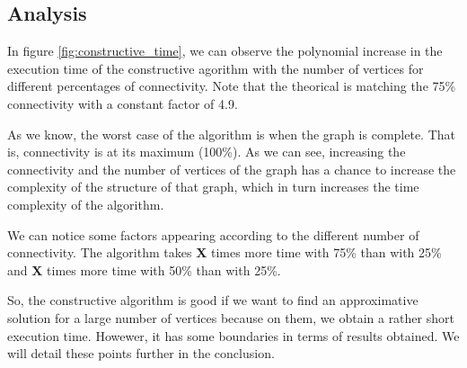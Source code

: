 
\subsection{Analysis}

In figure \ref{fig:constructive_time}, we can observe the polynomial increase in the execution time of the constructive agorithm with the number of vertices for different percentages of connectivity. Note that the theorical is matching the 75\% connectivity with a constant factor of 4.9.
\bigskip

As we know, the worst case of the algorithm is when the graph is complete. That is, connectivity is at its maximum (100\%). As we can see, increasing the connectivity and the number of vertices of the graph has a chance to increase the complexity of the structure of that graph, which in turn increases the time complexity of the algorithm. 
\bigskip

We can notice some factors appearing according to the different number of connectivity. The algorithm takes \textbf{X} times more time with 75\% than with 25\% and \textbf{X} times more time with 50\% than with 25\%.

So, the constructive algorithm is good if we want to find an approximative solution for a large number of vertices because on them, we obtain a rather short execution time. Howewer, it has some boundaries in terms of results obtained. We will detail these points further in the conclusion.